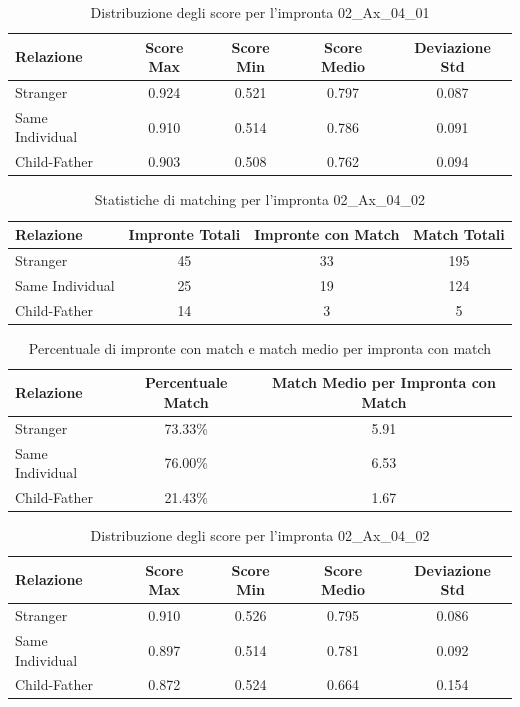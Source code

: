 \begin{table}[htbp]
\centering
\caption{Distribuzione degli score per l'impronta 02\_Ax\_04\_01}
\label{tab:scores_02_Ax_04_01}
\begin{tabular}{|l|c|c|c|c|}
\hline
\textbf{Relazione} & \textbf{Score Max} & \textbf{Score Min} & \textbf{Score Medio} & \textbf{Deviazione Std} \\
\hline
Stranger & 0.924 & 0.521 & 0.797 & 0.087 \\
\hline
Same Individual & 0.910 & 0.514 & 0.786 & 0.091 \\
\hline
Child-Father & 0.903 & 0.508 & 0.762 & 0.094 \\
\hline
\end{tabular}
\end{table}


\begin{table}[htbp]
\centering
\caption{Statistiche di matching per l'impronta 02\_Ax\_04\_02}
\label{tab:results_02_Ax_04_02}
\begin{tabular}{|l|c|c|c|}
\hline
\textbf{Relazione} & \textbf{Impronte Totali} & \textbf{Impronte con Match} & \textbf{Match Totali} \\
\hline
Stranger & 45 & 33 & 195 \\
\hline
Same Individual & 25 & 19 & 124 \\
\hline
Child-Father & 14 & 3 & 5 \\
\hline
\end{tabular}
\end{table}


\begin{table}[htbp]
\centering
\caption{Percentuale di impronte con match e match medio per impronta con match}
\label{tab:match_percentage_02_Ax_04_02}
\begin{tabular}{|l|c|c|}
\hline
\textbf{Relazione} & \textbf{Percentuale Match} & \textbf{Match Medio per Impronta con Match} \\
\hline
Stranger & 73.33\% & 5.91 \\
\hline
Same Individual & 76.00\% & 6.53 \\
\hline
Child-Father & 21.43\% & 1.67 \\
\hline
\end{tabular}
\end{table}


\begin{table}[htbp]
\centering
\caption{Distribuzione degli score per l'impronta 02\_Ax\_04\_02}
\label{tab:scores_02_Ax_04_02}
\begin{tabular}{|l|c|c|c|c|}
\hline
\textbf{Relazione} & \textbf{Score Max} & \textbf{Score Min} & \textbf{Score Medio} & \textbf{Deviazione Std} \\
\hline
Stranger & 0.910 & 0.526 & 0.795 & 0.086 \\
\hline
Same Individual & 0.897 & 0.514 & 0.781 & 0.092 \\
\hline
Child-Father & 0.872 & 0.524 & 0.664 & 0.154 \\
\hline
\end{tabular}
\end{table}


